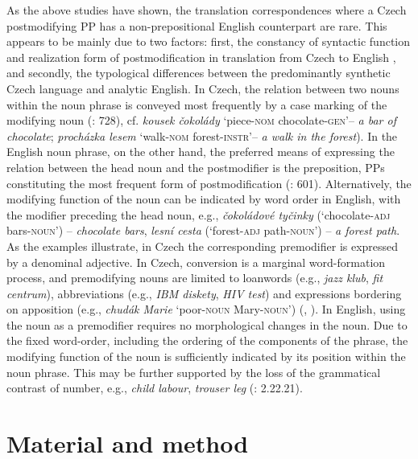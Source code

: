 \documentclass[output=paper]{langscibook}
\begin{document}
As the above studies have shown, the translation correspondences where a Czech postmodifying PP has a non-prepositional English counterpart are rare. This appears to be mainly due to two factors: first, the constancy of syntactic function and realization form of postmodification in translation from Czech to English \citep{Dušková2015}, and secondly, the typological differences between the predominantly synthetic Czech language and analytic English.  In Czech, the relation between two nouns within the noun phrase is conveyed most frequently by a case marking of the modifying noun (\citealt{ŠtíchaEtAl2013}: 728), cf. \textit{kousek čokolády} ‘piece-\textsc{nom} chocolate-\textsc{gen}’– \textit{a bar of chocolate}; \textit{procházka lesem} ‘walk-\textsc{nom} forest-\textsc{instr}’– \textit{a walk in the forest}). In the English noun phrase, on the other hand, the preferred means of expressing the relation between the head noun and the postmodifier is the preposition, PPs constituting the most frequent form of postmodification (\citealt{BiberEtAl2021}: 601). Alternatively, the modifying function of the noun can be indicated by word order in English, with the modifier preceding the head noun, e.g., \textit{čokoládové tyčinky} (‘chocolate-\textsc{adj} bars-\textsc{noun}’) – \textit{chocolate bars}, \textit{lesní cesta} (‘forest{}-\textsc{adj} path-\textsc{noun}’) – \textit{a forest path}. As the examples illustrate, in Czech the corresponding premodifier is expressed by a denominal adjective. In Czech, conversion is a marginal word-formation process, and premodifying nouns are limited to loanwords (e.g., \textit{jazz klub}, \textit{fit centrum}), abbreviations (e.g., \textit{IBM diskety}, \textit{HIV test}) and expressions bordering on apposition (e.g., \textit{chudák Marie} ‘poor{}-\textsc{noun} Mary-\textsc{noun}’) (\citealt{Veselovská2017}, \citealt{Karlík2017}). In English, using the noun as a premodifier requires no morphological changes in the noun. Due to the fixed word-order, including the ordering of the components of the phrase, the modifying function of the noun is sufficiently indicated by its position within the noun phrase. This may be further supported by the loss of the grammatical contrast of number, e.g., \textit{child labour}, \textit{trouser leg} (\citealt{DuškováEtAl2009}: 2.22.21).

\section{Material and method}\label{sec:mala:2}
\end{document}
